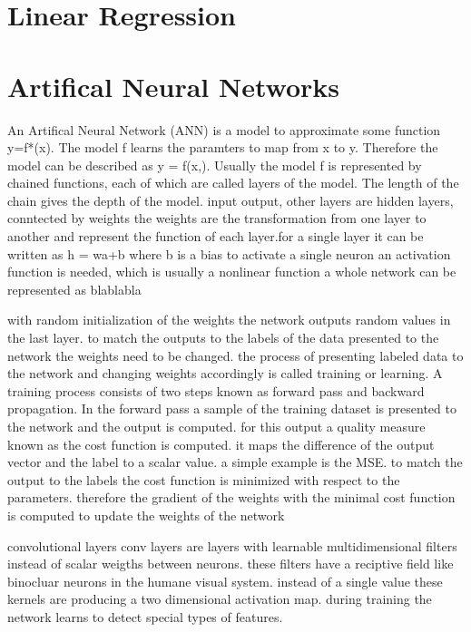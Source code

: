 \documentclass{scrreprt}
\begin{document}
\section{Linear Regression}

\section{Artifical Neural Networks}
An Artifical Neural Network (ANN) is a model to approximate some function y=f*(x). The model f learns the paramters \texttheta to map from x to y. Therefore the model can be described as y = f(x,\texttheta). Usually the model f is represented by chained functions, each of which are called layers of the model. The length of the chain gives the depth of the model.
input output, other layers are hidden layers, conntected by weights
the weights are the transformation from one layer to another and represent the function of each layer.for a single layer it can be written as h = wa+b where b is a bias
to activate a single neuron an activation function is needed, which is usually a nonlinear function
a whole network can be represented as blablabla

with random initialization of the weights the network outputs random values in the last layer. to match the outputs to the labels of the data presented to the network the weights need to be changed. the process of presenting labeled data to the network and changing weights accordingly is called training or learning. A training process consists of two steps known as forward pass and backward propagation. In the forward pass a sample of the training dataset is presented to the network and the output is computed. for this output a quality measure known as the cost function is computed. it maps the difference of the output vector and the label to a scalar value. a simple example is the MSE. to match the output to the labels the cost function is minimized with respect to the parameters. therefore the gradient of the weights with the minimal cost function is computed to update the weights of the network

convolutional layers
conv layers are layers with learnable multidimensional filters instead of scalar weigths between neurons. these filters have a reciptive field like binocluar neurons in the humane visual system. instead of a single value these kernels are producing a two dimensional activation map. during training the network learns to detect special types of features.
\end{document}
